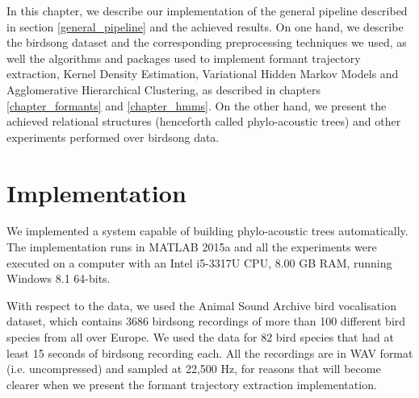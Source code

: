 \documentclass[../main.tex]{subfiles}
\begin{document}
 \label{chapter_account}
In this chapter, we describe our implementation of the general pipeline described in section \ref{general_pipeline} and the achieved results. On one hand, we describe the birdsong dataset and the corresponding preprocessing techniques we used, as well the algorithms and packages used to implement formant trajectory extraction, Kernel Density Estimation, Variational Hidden Markov Models and Agglomerative Hierarchical Clustering, as described in chapters \ref{chapter_formants} and \ref{chapter_hmms}. On the other hand, we present the achieved relational structures (henceforth called phylo-acoustic trees) and other experiments performed over birdsong data.

\section{Implementation} \label{section_implementation}
We implemented a system capable of building phylo-acoustic trees automatically. The implementation runs in MATLAB 2015a and all the experiments were executed on a computer with an Intel i5-3317U CPU, 8.00 GB RAM, running Windows 8.1 64-bits. 
\par With respect to the data, we used the Animal Sound Archive bird vocalisation dataset, which contains 3686 birdsong recordings of more than 100 different bird species from all over Europe. We used the data for 82 bird species that had at least 15 seconds of birdsong recording each. All the recordings are in WAV format (i.e. uncompressed) and sampled at 22,500 Hz, for reasons that will become clearer when we present the formant trajectory extraction implementation. 
\end{document}
